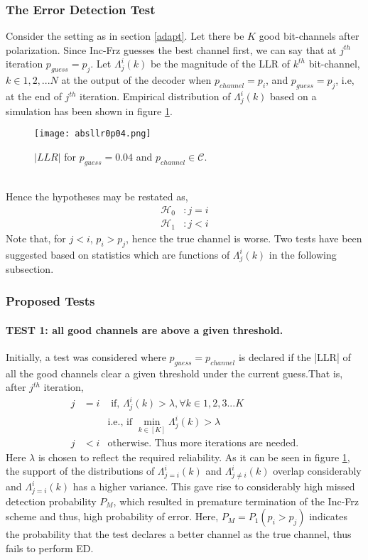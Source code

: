 \documentclass[
11pt, %
a4paper, %
oneside, %
headinclude,footinclude, %
BCOR5mm, %
]{scrartcl}
\begin{document}
\subsubsection{The Error Detection Test }
Consider the setting as in section \ref{adapt}. Let there be $K$ good bit-channels after polarization.  
Since Inc-Frz guesses the best channel first, we can say that at $j^{th}$ iteration $p_{guess}=p_j$. 
Let $\Lambda_j^i(k)$ be the magnitude of the LLR of $k^{th}$ bit-channel,$k\in{1,2,...N}$ at the output of the decoder when $p_{channel}=p_i$, and $p_{guess}=p_j$, i.e, at the end of $j^{th}$ iteration. Empirical distribution of $\Lambda_j^i(k)$ based on a simulation has been shown in figure \ref{fig:absllr}.
\begin{figure}[h]
 \begin{center}
    \texttt{[image: absllr0p04.png]}
  \end{center}
  \caption{$|LLR|$ for $p_{guess}=0.04$ and $p_{channel} \in \mathcal{C}$.}
  \label{fig:absllr}
\end{figure}\\
Hence the hypotheses may be restated as,
\begin{align*}
\mathcal{H}_0 & :j=i\\
\mathcal{H}_1 & :j<i
\end{align*}
Note that, for $j < i$, $p_i > p_j$, hence the true channel is worse. Two tests have been suggested based on statistics which are functions of  $\Lambda_j^i(k)$ in the following subsection.

\subsubsection{Proposed Tests}
\paragraph{TEST 1: all good channels are above a given threshold.} Initially, a test was considered where $p_{guess}=p_{channel}$ is declared if the |LLR| of all the good channels clear a given threshold under the current guess.That is, after $j^{th}$ iteration,
\begin{align*}  
j & =i &\text{   if, }  \Lambda_{j}^i(k) > \lambda, \forall k \in {1,2,3...K}\\
 & &\text{i.e., if } \min_{k \in [K]}\Lambda_{j}^i(k) > \lambda  \\
 j & < i  &\text{otherwise. Thus more iterations are needed.}
\end{align*} 
Here $\lambda$ is chosen to reflect the required reliability. As it can be seen in figure \ref{fig:absllr}, the support of the distributions of $\Lambda_{j=i}^i(k)$ and $\Lambda_{j \neq i}^i(k)$ overlap considerably and $\Lambda_{j=i}^i(k)$ has a higher variance. This gave rise to considerably high missed detection probability $P_M$, which resulted in premature termination of the Inc-Frz scheme and thus, high probability of error. Here, $P_M=P_1(p_i>p_j)$ indicates the probability that the test declares a better channel as the true channel, thus fails to perform ED.
\end{document}
